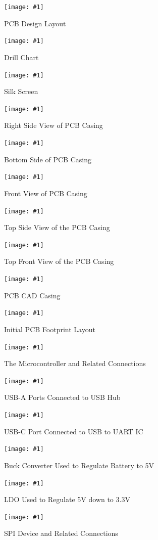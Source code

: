 \documentclass[12pt]{article}
\newcommand{\quickfigure}[4]{%
\begin{figure}[!htbp]
\centering
\texttt{[image: \#1]}
\caption{#3}
\label{#4}
\end{figure}%
}
\begin{document}
\newpage
\quickfigure{pcb-design-layout.png}{15cm}{PCB Design Layout}{pcb-design-layout}

\quickfigure{images/drill-chart.png}{15cm}{Drill Chart}{drill-chart}

\quickfigure{images/silk-screen.png}{15cm}{Silk Screen}{silk-screen}

\quickfigure{images/right-side-of-PCB-casing.png}{15cm}{Right Side View of PCB Casing}{right-side-view-pcb-casing}

\quickfigure{images/bottom-side-of-PCB-casing.png}{15cm}{Bottom Side of PCB Casing}{bottom-side-pcb-casing}

\quickfigure{images/front-view-of-PCB-casing.png}{15cm}{Front View of PCB Casing}{front-view-pcb-casing}

\quickfigure{images/top-view-PCB-casing-open.png}{15cm}{Top Side View of the PCB Casing}{top-side-view-pcb-casing}

\quickfigure{images/top-front-view-PCB-casing-open.png}{15cm}{Top Front View of the PCB Casing}{top-front-view-pcb-casing}

\quickfigure{images/PCB-CAD-drawing.png}{15cm}{PCB CAD Casing}{pcb-cad-casing}

\quickfigure{images/initial-PCB-footprint-layout.png}{15cm}{Initial PCB Footprint Layout}{initial-pcb-footprint-layout}

\quickfigure{images/microcontroller.png}{15cm}{The Microcontroller and Related Connections}{microcontroller}
\quickfigure{images/usb-a.png}{15cm}{USB-A Ports Connected to USB Hub}{usb-a}
\quickfigure{images/usb-c.png}{15cm}{USB-C Port Connected to USB to UART IC}{usb-c}
\quickfigure{images/buck.png}{15cm}{Buck Converter Used to Regulate Battery to 5V}{buck}
\quickfigure{images/ldo.png}{15cm}{LDO Used to Regulate 5V down to 3.3V}{ldo}
\quickfigure{images/spi.png}{15cm}{SPI Device and Related Connections}{spi}
\end{document}
